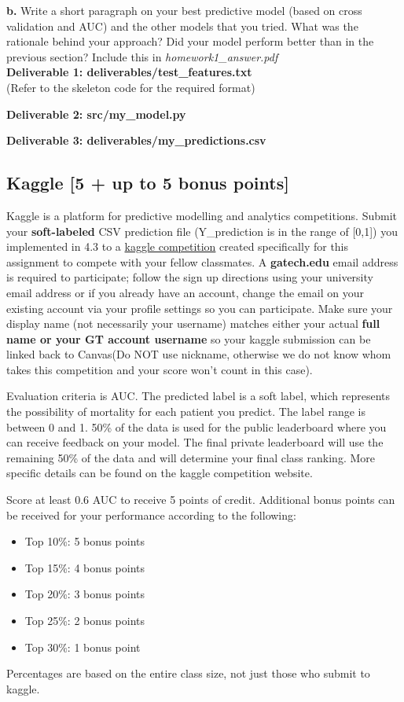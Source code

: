 \documentclass[12pt]{article}
\begin{document}
\textbf{b.} Write a short paragraph on your best predictive model (based on cross validation and AUC) and the other models that you tried. What was the rationale behind your approach? Did your model perform better than in the previous section? Include this in \textit{homework1\_answer.pdf}\\

\textbf{Deliverable 1: deliverables/test\_features.txt}\\(Refer to the skeleton code for the required format)  

\textbf{Deliverable 2: src/my\_model.py}

\textbf{Deliverable 3: deliverables/my\_predictions.csv}


\subsection{Kaggle [5 + up to 5 bonus points]}
Kaggle is a platform for predictive modelling and analytics competitions. Submit your \textbf{soft-labeled} CSV prediction file (Y\_prediction is in the range of [0,1]) you implemented in 4.3 to a \href{https://www.kaggle.com/c/2019-spring-cse6250-bdh}{kaggle competition} created specifically for this assignment to compete with your fellow classmates. A \textbf{gatech.edu} email address is required to participate; follow the sign up directions using your university email address or if you already have an account, change the email on your existing account via your profile settings so you can participate. Make sure your display name (not necessarily your username) matches either your actual \textbf{full name or your GT account username} so your kaggle submission can be linked back to Canvas(Do NOT use nickname, otherwise we do not know whom takes this competition and your score won't count in this case).

Evaluation criteria is AUC. The predicted label is a soft label, which represents the possibility of mortality for each patient you predict. The label range is between 0 and 1. 50\% of the data is used for the public leaderboard where you can receive feedback on your model. The final private leaderboard will use the remaining 50\% of the data and will determine your final class ranking. More specific details can be found on the kaggle competition website.

Score at least 0.6 AUC to receive 5 points of credit. Additional bonus points can be received for your performance according to the following:

\begin{itemize}
\item Top 10\%: 5 bonus points
\item Top 15\%: 4 bonus points
\item Top 20\%: 3 bonus points
\item Top 25\%: 2 bonus points
\item Top 30\%: 1 bonus point
\end{itemize}
Percentages are based on the entire class size, not just those who submit to kaggle.
\end{document}
